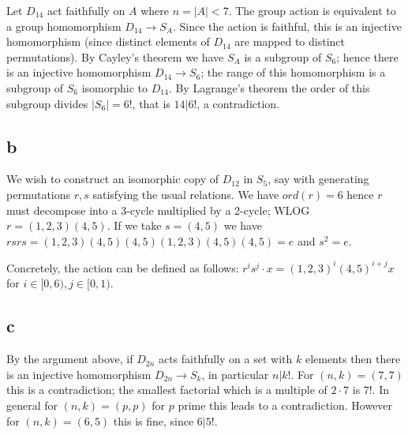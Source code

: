 \documentclass{article}
\begin{document}
Let $D_{14}$ act faithfully on $A$ where $n = |A| < 7$. The group action is equivalent to a group homomorphism $D_{14} \to S_A$. Since the action is faithful, this is an injective homomorphism (since distinct elements of $D_{14}$ are mapped to distinct permutations). By Cayley's theorem we have $S_A$ is a subgroup of $S_6$; hence there is an injective homomorphism $D_{14} \to S_6$; the range of this homomorphism is a subgroup of $S_6$ isomorphic to $D_{14}$. By Lagrange's theorem the order of this subgroup divides $|S_6| = 6!$, that is $14 | 6!$, a contradiction.

\subsection*{b}

We wish to construct an isomorphic copy of $D_{12}$ in $S_5$, say with generating permutations $r, s$ satisfying the usual relations. We have $ord(r) = 6$ hence $r$ must decompose into a 3-cycle multiplied by a 2-cycle; WLOG $r = (1,2,3)(4, 5)$. If we take $s = (4, 5)$ we have $rsrs = (1,2,3)(4, 5)(4, 5)(1,2,3)(4, 5)(4, 5) = e$ and $s^2 = e$.

Concretely, the action can be defined as follows: $r^i s^j \cdot x = (1, 2, 3)^i(4, 5)^{i+j}x$ for $i \in [0, 6), j \in [0, 1)$.

\subsection*{c}

By the argument above, if $D_{2n}$ acts faithfully on a set with $k$ elements then there is an injective homomorphism $D_{2n} \to S_k$, in particular $n | k!$. For $(n, k) = (7, 7)$ this is a contradiction; the smallest factorial which is a multiple of $2 \cdot 7$ is $7!$. In general for $(n, k) = (p, p)$ for $p$ prime this leads to a contradiction. However for $(n, k) = (6, 5)$ this is fine, since $6 | 5!$.




\end{document}
